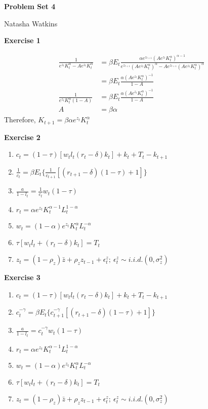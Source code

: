\documentclass[letterpaper,12pt]{article}
\begin{document}
\textbf{\large Problem Set 4}

Natasha Watkins

\vspace{5mm}

\textbf{Exercise 1}

\begin{align*}
\frac{1}{e^{z_t}K_t^\alpha - Ae^{z_t}K_t^\alpha} &=
\beta E_t \frac{\alpha e^{z_{t+1}} (Ae^{z_t}K_t^\alpha)^{\alpha-1} } {e^{z_{t+1}} (Ae^{z_t}K_t^\alpha)^\alpha - Ae^{z_{t+1}}(Ae^{z_t}K_t^\alpha)^\alpha} \\
&= 
\beta E_t \frac{\alpha  (Ae^{z_t}K_t^\alpha)^{-1}}{ 1 - A} \\
\frac{1}{e^{z_t}K_t^\alpha(1 - A)}
&= 
\beta E_t \frac{\alpha  (Ae^{z_t}K_t^\alpha)^{-1}}{ 1 - A} \\
A
&= 
\beta \alpha
\end{align*}
Therefore,
$K_{t+1} = \beta \alpha e^{z_t} K_t^\alpha$

\textbf{Exercise 2}

\begin{enumerate}
	\item $c_t = (1 - \tau)[w_t l_t (r_t - \delta) k_t] + k_t + T_t - k_{t+1}$
	\item $\frac{1}{c_t} = \beta E_t \{\frac{1}{c_{t+1}} [(r_{t+1} - \delta)(1 - \tau) + 1]\}$
	\item $\frac{a}{1 - l_t} = \frac{1}{c_t} w_t (1 - \tau)$
	\item $r_t = \alpha e^{z_t} K_t^{\alpha - 1} L_t^{1 - \alpha}$
	\item $w_t = (1 - \alpha) e^{z_t} K_t^\alpha L_t^{-\alpha}$
	\item $\tau[w_t l_t + (r_t - \delta) k_t] = T_t$
	\item $z_t = (1 - \rho_z) \bar{z} + \rho_z z_{t-1} + \epsilon_t^z; \ \epsilon_t^z \sim i.i.d.(0, \sigma_z^2)$
\end{enumerate}

\textbf{Exercise 3}

\begin{enumerate}
	\item $c_t = (1 - \tau)[w_t l_t (r_t - \delta) k_t] + k_t + T_t - k_{t+1}$
	\item $c_t^{-\gamma} = \beta E_t \{c_{t+1}^{-\gamma} [(r_{t+1} - \delta)(1 - \tau) + 1]\}$
	\item $\frac{a}{1 - l_t} = c_t^{-\gamma} w_t (1 - \tau)$
	\item $r_t = \alpha e^{z_t} K_t^{\alpha - 1} L_t^{1 - \alpha}$
	\item $w_t = (1 - \alpha) e^{z_t} K_t^\alpha L_t^{-\alpha}$
	\item $\tau[w_t l_t + (r_t - \delta) k_t] = T_t$
	\item $z_t = (1 - \rho_z) \bar{z} + \rho_z z_{t-1} + \epsilon_t^z; \ \epsilon_t^z \sim i.i.d.(0, \sigma_z^2)$
\end{enumerate}
\end{document}
